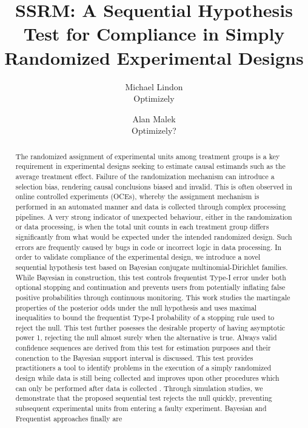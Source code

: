 \documentclass[11pt]{article}
\begin{document}
\vspace{-1in}
\title{SSRM: A Sequential Hypothesis Test for Compliance in Simply Randomized Experimental Designs}
\author{\Large Michael Lindon \\ Optimizely \and Alan Malek \\ Optimizely?}
\maketitle 
\begin{abstract}
  The randomized  assignment of experimental units among treatment groups is a key requirement in experimental designs seeking to estimate causal estimands  such as the average treatment effect. Failure of the randomization mechanism can introduce a selection bias, rendering causal conclusions biased and invalid. This is often observed in online controlled experiments (OCEs), whereby the assignment mechanism is performed in an automated manner and data is collected through complex processing pipelines. A very strong indicator of unexpected behaviour, either in the randomization or data processing, is when the total unit counts in each treatment group differs significantly from what would be expected under the intended randomized design. Such errors are frequently caused by bugs in code or incorrect logic in data processing. In order to validate compliance  of the experimental design, we introduce a novel  sequential hypothesis test based on Bayesian conjugate multinomial-Dirichlet families. While Bayesian in construction, this test controls frequentist Type-I error under both optional stopping and continuation and prevents users from potentially inflating false positive probabilities through continuous monitoring. This work studies the martingale properties of the posterior odds under the null hypothesis and uses maximal inequalities to bound the frequentist Type-I probability of a stopping rule used to reject the null.  This test further posesses the desirable property of having asymptotic power 1, rejecting the null almost surely when the alternative is true. Always valid confidence sequences  are derived from this test for estimation purposes and their conenction to the Bayesian support interval is discussed. This test  provides practitioners a tool to identify problems in the execution of a simply randomized design while data is still being collected and improves upon other procedures which can only be performed after data is collected . Through simulation studies, we demonstrate that the proposed sequential test rejects the null quickly, preventing subsequent experimental units from entering a faulty experiment. Bayesian and Frequentist approaches finally are 
\end{abstract}
\end{document}
